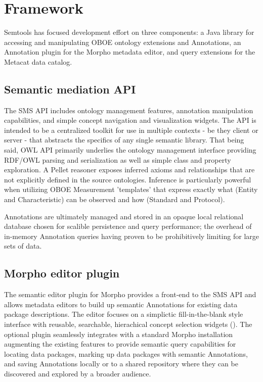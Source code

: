 \section{Framework}
\label{sec:framework}

Semtools has focused development effort on three components:
a Java library for accessing and manipulating OBOE ontology extensions and Annotations,
an Annotation plugin for the Morpho metadata editor, and query extensions for the Metacat data catalog.

\subsection{Semantic mediation API}
The SMS API includes ontology management features, annotation manipulation capabilities, and simple concept navigation and visualization widgets. The API is intended to be a centralized toolkit for use in multiple contexts - be they client or server - that abstracts the specifics of any single semantic library. That being said, OWL API primarily underlies the ontology management interface providing RDF/OWL parsing and serialization as well as simple class and property exploration. A Pellet reasoner exposes inferred axioms and relationships that are not explicitly defined in the source ontologies. Inference is particularly powerful when utilizing OBOE Measurement 'templates' that express exactly what (Entity and Characteristic) can be observed and how (Standard and Protocol). 

Annotations are ultimately managed and stored in an opaque local relational database chosen for scalible persistence and query performance; the overhead of in-memory Annotation queries having proven to be prohibitively limiting for large sets of data.

\subsection{Morpho editor plugin}
The semantic editor plugin for Morpho provides a front-end to the SMS API and allows metadata editors to build up semantic Annotations for existing data package descriptions. The editor focuses on a simplictic fill-in-the-blank style interface with reusable, searchable, hierachical concept selection widgets (). The optional plugin seamlessly integrates with a standard Morpho installation augmenting the existing features to provide semantic query capabilities for locating data packages, marking up data packages with semantic Annotations, and saving Annotations locally or to a shared repository where they can be discovered and explored by a broader audience.


